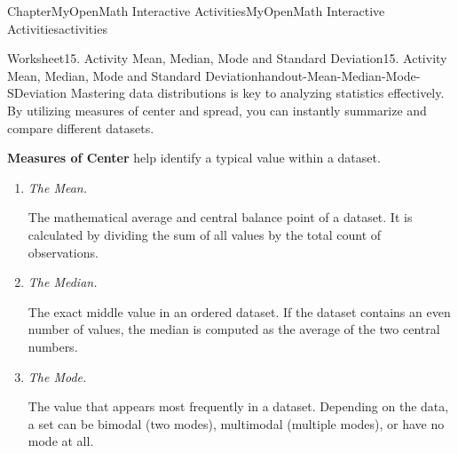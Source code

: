 \documentclass[oneside,10pt,]{book}
\newcommand{\blocktitlefont}{\relax}
\newcommand{\ptxlistdisc}{\raisebox{0.3ex}{\textbullet}}
\newcommand{\terminology}[1]{\textbf{#1}}
\newlength{\fillinmaxwidth}
\newlength{\fillincontract}
\newlength{\charmaxwidth}\setlength{\charmaxwidth}{0.5em}
\newlength{\charminwidth}\setlength{\charminwidth}{0.1em}
\newlength{\fillinheight}
\newcommand{\fillintext}[1]{%
\setlength{\fillinmaxwidth}{#1\charmaxwidth}%
\setlength{\fillincontract}{#1\charminwidth}%
\setlength{\fillinheight}{\baselineskip}\addtolength{\fillinheight}{1.2pt}%
\strut\nobreak\leaders\vbox{\hrule width 0.3pt height 0.3pt \vskip -1.2pt}\hskip 1\fillinmaxwidth minus \fillincontract\nobreak\strut%
}
\newcommand{\lititle}[1]{{\slshape#1}}
\begin{document}
\begin{chapterptx}{Chapter}{MyOpenMath Interactive Activities}{}{MyOpenMath Interactive Activities}{}{}{activities}
%
\begin{worksheet-section}{Worksheet}{15. Activity Mean, Median, Mode and Standard Deviation}{}{15. Activity Mean, Median, Mode and Standard Deviation}{}{}{handout-Mean-Median-Mode-SDeviation}
Mastering data distributions is key to analyzing statistics effectively. By utilizing measures of center and spread, you can instantly summarize and compare different datasets.%
\par
\terminology{Measures of Center} help identify a typical value within a dataset.%
%
\begin{enumerate}[label={(\alph*)}]
\item{}\lititle{The Mean.}\par%
The mathematical average and central balance point of a dataset. It is calculated by dividing the sum of all values by the total count of observations.%
\item{}\lititle{The Median.}\par%
The exact middle value in an ordered dataset. If the dataset contains an even number of values, the median is computed as the average of the two central numbers.%
\item{}\lititle{The Mode.}\par%
The value that appears most frequently in a dataset. Depending on the data, a set can be bimodal (two modes), multimodal (multiple modes), or have no mode at all.%
\end{enumerate}
\end{worksheet-section}
\end{chapterptx}
\end{document}
